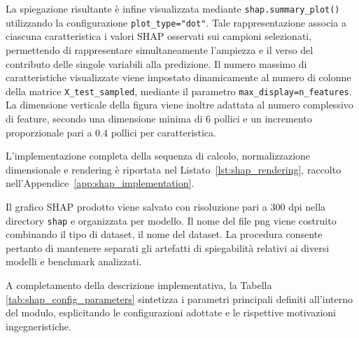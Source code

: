 La spiegazione risultante è infine visualizzata mediante \texttt{shap.summary\_plot()} utilizzando la configurazione \texttt{plot\_type="dot"}. 
Tale rappresentazione associa a ciascuna caratteristica i valori SHAP osservati sui campioni selezionati, permettendo di rappresentare simultaneamente l'ampiezza e il verso del contributo delle singole variabili alla predizione. 
Il numero massimo di caratteristiche visualizzate viene impostato dinamicamente al numero di colonne della matrice \texttt{X\_test\_sampled}, mediante il parametro \texttt{max\_display=n\_features}. 
La dimensione verticale della figura viene inoltre adattata al numero complessivo di feature, secondo una dimensione minima di $6$ pollici e un incremento proporzionale pari a $0.4$ pollici per caratteristica.

L'implementazione completa della sequenza di calcolo, normalizzazione dimensionale e rendering è riportata nel Listato~\ref{lst:shap_rendering}, raccolto nell'Appendice~\ref{app:shap_implementation}.

Il grafico SHAP prodotto viene salvato con risoluzione pari a $300$ dpi nella directory \texttt{shap} e organizzata per modello. 
Il nome del file png viene costruito combinando il tipo di dataset, il nome del dataset. 
La procedura consente pertanto di mantenere separati gli artefatti di spiegabilità relativi ai diversi modelli e benchmark analizzati.

A completamento della descrizione implementativa, la Tabella \ref{tab:shap_config_parameters} sintetizza i parametri principali definiti all'interno del modulo, esplicitando le configurazioni adottate e le rispettive motivazioni ingegneristiche.

